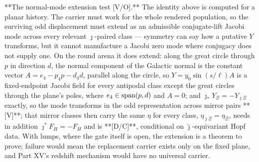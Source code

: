 **The normal-mode extension test [V/O].** The identity above is computed for a planar history. The carrier must work for the whole rendered population, so the surviving odd displacement must extend as an admissible conjugate-lift Jacobi mode across every relevant $\jmath$-paired class — symmetry can say how a putative $Y$ transforms, but it cannot manufacture a Jacobi zero mode where conjugacy does not supply one. On the round arena it does extend: along the great circle through $p$ in direction $d$, the normal component of the Galactic normal is the constant vector $A = e_4-p_4p-d_4d$, parallel along the circle, so $Y = y_0\sin(s/\ell)A$ is a fixed-endpoint Jacobi field for every antipodal class except the great circles through the plane's poles, where $e_4\in{\rm span}(p,d)$ and $A = 0$; and $\jmath_*Y_\Xi = -Y_{\jmath\Xi}$ exactly, so the mode transforms in the odd representation across mirror pairs **[V]**; that mirror classes then carry the same $\eta$ for every class, $\eta_{\jmath\Xi} = \eta_\Xi$, needs in addition $\jmath^*F_H = -F_H$ and is **[D/C]**, conditional on $\widetilde\jmath$-equivariant Hopf data. With lumps, where the gate itself is open, the extension is a theorem to prove; failure would mean the replacement carrier exists only on the fixed plane, and Part XV's redshift mechanism would have no universal carrier.

